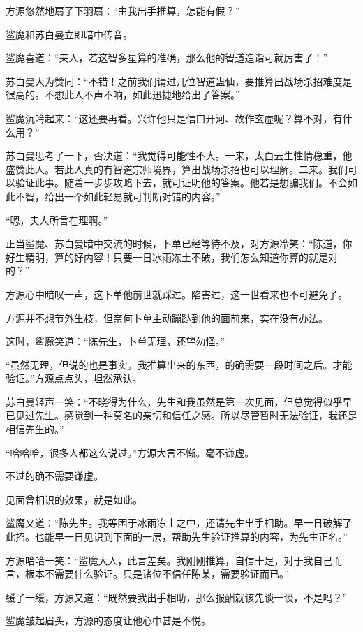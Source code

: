 \begin{this_body}
方源悠然地扇了下羽扇：“由我出手推算，怎能有假？”

鲨魔和苏白曼立即暗中传音。

鲨魔喜道：“夫人，若这智多星算的准确，那么他的智道造诣可就厉害了！”

苏白曼大为赞同：“不错！之前我们请过几位智道蛊仙，要推算出战场杀招难度是很高的。不想此人不声不响，如此迅捷地给出了答案。”

鲨魔沉吟起来：“这还要再看。兴许他只是信口开河、故作玄虚呢？算不对，有什么用？”

苏白曼思考了一下，否决道：“我觉得可能性不大。一来，太白云生性情稳重，他盛赞此人。若此人真的有智道宗师境界，算出战场杀招也可以理解。二来。我们可以验证此事。随着一步步攻略下去，就可证明他的答案。他若是想骗我们。不会如此不智，给出一个如此轻易就可判断对错的内容。”

“嗯，夫人所言在理啊。”

正当鲨魔、苏白曼暗中交流的时候，卜单已经等待不及，对方源冷笑：“陈道，你好生精明，算的好内容！只要一日冰雨冻土不破，我们怎么知道你算的就是对的？”

方源心中暗叹一声，这卜单他前世就踩过。陷害过，这一世看来也不可避免了。

方源并不想节外生枝，但奈何卜单主动蹦跶到他的面前来，实在没有办法。

这时，鲨魔笑道：“陈先生，卜单无理，还望勿怪。”

“虽然无理，但说的也是事实。我推算出来的东西，的确需要一段时间之后。才能验证。”方源点点头，坦然承认。

苏白曼轻声一笑：“不晓得为什么，先生和我虽然是第一次见面，但总觉得似乎早已见过先生。感觉到一种莫名的亲切和信任之感。所以尽管暂时无法验证，我还是相信先生的。”

“哈哈哈，很多人都这么说过。”方源大言不惭。毫不谦虚。

不过的确不需要谦虚。

见面曾相识的效果，就是如此。

鲨魔又道：“陈先生。我等困于冰雨冻土之中，还请先生出手相助。早一日破解了此招。也能早一日见识到下面的一层，帮助先生验证推算的内容，为先生正名。”

方源哈哈一笑：“鲨魔大人，此言差矣。我刚刚推算，自信十足，对于我自己而言，根本不需要什么验证。只是诸位不信任陈某，需要验证而已。”

缓了一缓，方源又道：“既然要我出手相助，那么报酬就该先谈一谈，不是吗？”

鲨魔皱起眉头，方源的态度让他心中甚是不悦。


\end{this_body}
